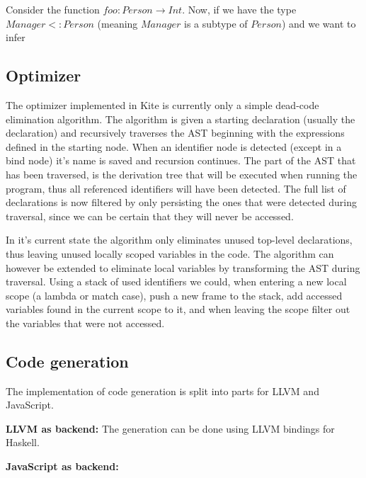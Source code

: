 Consider the function $foo : Person \to Int$. Now, if we have the type $Manager <: Person$ (meaning $Manager$ is a subtype of $Person$) and we want to infer %



\subsection{Optimizer}

The optimizer implemented in Kite is currently only a simple dead-code elimination algorithm. The algorithm is given a starting declaration (usually the  declaration) and recursively traverses the AST beginning with the expressions defined in the starting node. When an identifier node is detected (except in a bind node) it's name is saved and recursion continues. The part of the AST that has been traversed, is the derivation tree that will be executed when running the program, thus all referenced identifiers will have been detected. The full list of declarations is now filtered by only persisting the ones that were detected during traversal, since we can be certain that they will never be accessed.

In it's current state the algorithm only eliminates unused top-level declarations, thus leaving unused locally scoped variables in the code. The algorithm can however be extended to eliminate local variables by transforming the AST during traversal. Using a stack of used identifiers we could, when entering a new local scope (a lambda or match case), push a new frame to the stack, add accessed variables found in the current scope to it, and when leaving the scope filter out the variables that were not accessed.

\subsection{Code generation}

The implementation of code generation is split into parts for LLVM and JavaScript.

\textbf{LLVM as backend:} The generation can be done using LLVM
bindings for Haskell. 


\textbf{JavaScript as backend:}





